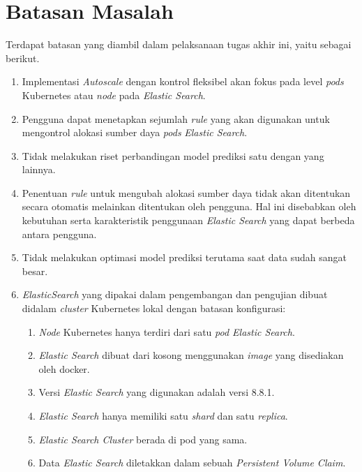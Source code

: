 \section{Batasan Masalah}
\label{sec:batasan-masalah}

Terdapat batasan yang diambil dalam pelaksanaan tugas akhir ini, yaitu sebagai berikut.

\begin{enumerate}
    \item Implementasi \textit{Autoscale} dengan kontrol fleksibel akan fokus pada level \textit{pods} Kubernetes atau \textit{node} pada \textit{Elastic Search}.
    \item Pengguna dapat menetapkan sejumlah \textit{rule} yang akan digunakan untuk mengontrol alokasi sumber daya \textit{pods} \textit{Elastic Search}.
    \item Tidak melakukan riset perbandingan model prediksi satu dengan yang lainnya.
    \item Penentuan \textit{rule} untuk mengubah alokasi sumber daya tidak akan ditentukan secara otomatis melainkan ditentukan oleh pengguna. Hal ini disebabkan oleh kebutuhan serta karakteristik penggunaan \textit{Elastic Search} yang dapat berbeda antara pengguna.
    \item Tidak melakukan optimasi model prediksi terutama saat data sudah sangat besar.
    \item \textit{ElasticSearch} yang dipakai dalam pengembangan dan pengujian dibuat didalam \textit{cluster} Kubernetes lokal dengan batasan konfigurasi:
        \begin{enumerate}
            \item \textit{Node} Kubernetes hanya terdiri dari satu \textit{pod Elastic Search}.
            \item \textit{Elastic Search} dibuat dari kosong menggunakan \textit{image} yang disediakan oleh docker.
            \item Versi \textit{Elastic Search} yang digunakan adalah versi 8.8.1.
            \item \textit{Elastic Search} hanya memiliki satu \textit{shard} dan satu \textit{replica}.
            \item \textit{Elastic Search Cluster} berada di pod yang sama.
            \item Data \textit{Elastic Search} diletakkan dalam sebuah \textit{Persistent Volume Claim}.
        \end{enumerate}
 \end{enumerate}

